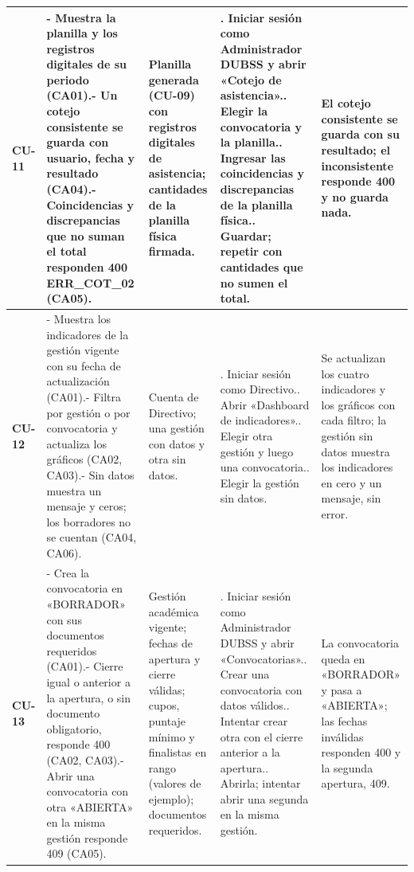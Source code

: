 {\begin{longtable}{@{}>{\raggedright\arraybackslash}p{1.2cm}>{\raggedright\arraybackslash}p{3.7cm}>{\raggedright\arraybackslash}p{3.0cm}>{\raggedright\arraybackslash}p{4.4cm}>{\raggedright\arraybackslash}p{3.4cm}@{}}
\textbf{CU-11} & - Muestra la planilla y los registros digitales de su periodo (CA01).\newline - Un cotejo consistente se guarda con usuario, fecha y resultado (CA04).\newline - Coincidencias y discrepancias que no suman el total responden 400 ERR\_COT\_02 (CA05). & Planilla generada (CU-09) con registros digitales de asistencia; cantidades de la planilla física firmada. & 1. Iniciar sesión como Administrador DUBSS y abrir «Cotejo de asistencia».\newline 2. Elegir la convocatoria y la planilla.\newline 3. Ingresar las coincidencias y discrepancias de la planilla física.\newline 4. Guardar; repetir con cantidades que no sumen el total. & El cotejo consistente se guarda con su resultado; el inconsistente responde 400 y no guarda nada. \\
\midrule
\textbf{CU-12} & - Muestra los indicadores de la gestión vigente con su fecha de actualización (CA01).\newline - Filtra por gestión o por convocatoria y actualiza los gráficos (CA02, CA03).\newline - Sin datos muestra un mensaje y ceros; los borradores no se cuentan (CA04, CA06). & Cuenta de Directivo; una gestión con datos y otra sin datos. & 1. Iniciar sesión como Directivo.\newline 2. Abrir «Dashboard de indicadores».\newline 3. Elegir otra gestión y luego una convocatoria.\newline 4. Elegir la gestión sin datos. & Se actualizan los cuatro indicadores y los gráficos con cada filtro; la gestión sin datos muestra los indicadores en cero y un mensaje, sin error. \\
\midrule
\textbf{CU-13} & - Crea la convocatoria en «BORRADOR» con sus documentos requeridos (CA01).\newline - Cierre igual o anterior a la apertura, o sin documento obligatorio, responde 400 (CA02, CA03).\newline - Abrir una convocatoria con otra «ABIERTA» en la misma gestión responde 409 (CA05). & Gestión académica vigente; fechas de apertura y cierre válidas; cupos, puntaje mínimo y finalistas en rango (valores de ejemplo); documentos requeridos. & 1. Iniciar sesión como Administrador DUBSS y abrir «Convocatorias».\newline 2. Crear una convocatoria con datos válidos.\newline 3. Intentar crear otra con el cierre anterior a la apertura.\newline 4. Abrirla; intentar abrir una segunda en la misma gestión. & La convocatoria queda en «BORRADOR» y pasa a «ABIERTA»; las fechas inválidas responden 400 y la segunda apertura, 409. \\

\end{longtable}}
